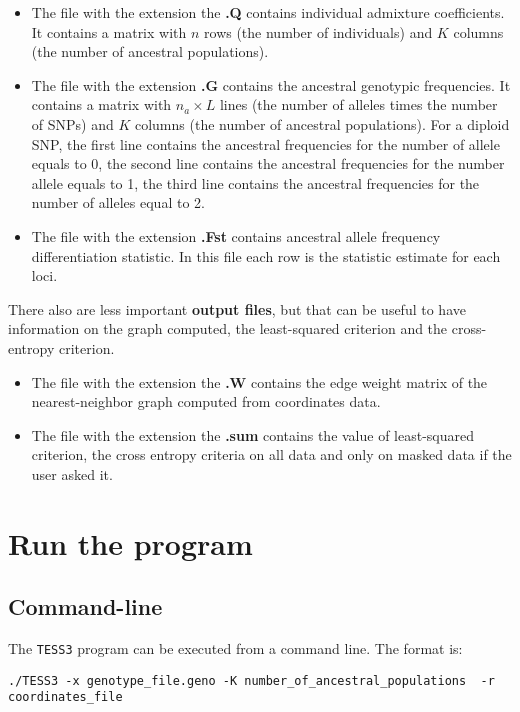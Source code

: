 \documentclass[10pt,a4paper]{article}
\begin{document}
\begin{itemize}
\item The file with the extension the {\bf .Q} contains individual admixture coefficients.
It contains a matrix with $n$ rows (the number of individuals) and $K$ columns (the 
number of ancestral populations).
\item The file with the extension {\bf .G} contains the ancestral genotypic frequencies.
It contains a matrix with $n_a\times L$ lines (the number of alleles times the number of SNPs) 
and $K$ columns (the number of ancestral populations). 
For a diploid SNP, the first line contains the ancestral frequencies for the number 
of allele equals to 0, the second line contains the ancestral frequencies for the 
number allele equals to 1, the third line contains the ancestral frequencies for 
the number of alleles equal to 2.
\item The file with the extension {\bf .Fst} contains ancestral allele frequency differentiation statistic. In this file each row is the statistic estimate for each loci. 
\end{itemize}

There also are less important {\bf output files}, but that can be useful to have information on the graph computed, the least-squared criterion and the cross-entropy criterion.

\begin{itemize}
\item The file with the extension the {\bf .W} contains the edge weight matrix of the nearest-neighbor graph computed from coordinates data.
\item The file with the extension the {\bf .sum} contains the value of least-squared criterion, the cross entropy criteria on all data and only on masked data if the user asked it.
\end{itemize}

\section{Run the program}
\subsection{Command-line}
The {\tt TESS3} program can be executed from a command line. The format is:
\begin{Verbatim}[frame=single]
./TESS3 -x genotype_file.geno -K number_of_ancestral_populations  -r coordinates_file
\end{Verbatim}
\end{document}
